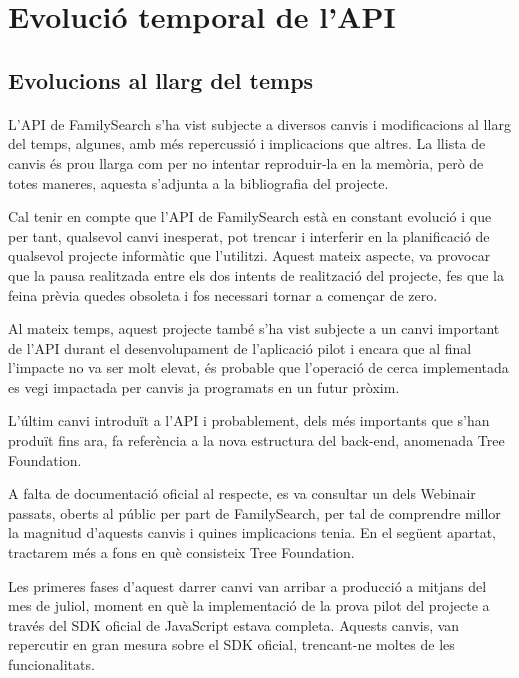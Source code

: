 \section{Evolució temporal de l'API}

    \subsection{Evolucions al llarg del temps}

    \paragraph{}
    L’API de FamilySearch s’ha vist subjecte a diversos canvis i modificacions al llarg del temps, algunes, amb més repercussió i implicacions que altres. La llista de canvis és prou llarga com per no intentar reproduir-la en la memòria, però de totes maneres, aquesta s'adjunta a la bibliografia del projecte.

    Cal tenir en compte que l'API de FamilySearch està en constant evolució i que per tant, qualsevol canvi inesperat, pot trencar i interferir en la planificació de qualsevol projecte informàtic que l'utilitzi. Aquest mateix aspecte, va provocar que la pausa realitzada entre els dos intents de realització del projecte, fes que la feina prèvia quedes obsoleta i fos necessari tornar a començar de zero.

    Al mateix temps, aquest projecte també s'ha vist subjecte a un canvi important de l'API durant el desenvolupament de l'aplicació pilot i encara que al final l'impacte no va ser molt elevat, és probable que l'operació de cerca implementada es vegi impactada per canvis ja programats en un futur pròxim.

    L’últim canvi introduït a l'API i probablement, dels més importants que s'han produït fins ara, fa referència a la nova estructura del back-end, anomenada Tree Foundation.

    A falta de documentació oficial al respecte, es va consultar un dels Webinair passats, oberts al públic per part de FamilySearch, per tal de comprendre millor la magnitud d'aquests canvis i quines implicacions tenia. En el següent apartat, tractarem més a fons en què consisteix Tree Foundation.

    Les primeres fases d'aquest darrer canvi van arribar a producció a mitjans del mes de juliol, moment en què la implementació de la prova pilot del projecte a través del SDK oficial de JavaScript estava completa. Aquests canvis, van repercutir en gran mesura sobre el SDK oficial, trencant-ne moltes de les funcionalitats.

